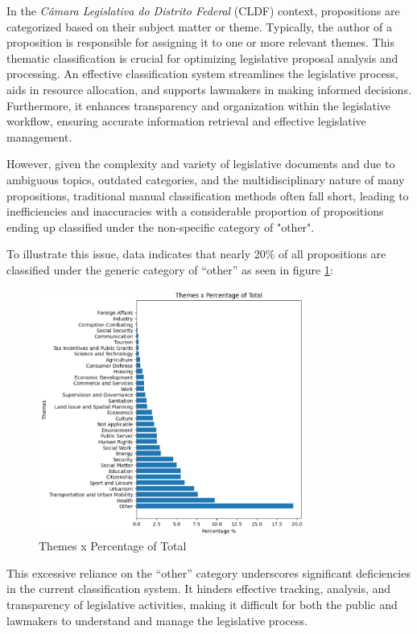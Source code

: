 \documentclass[12pt]{article}
\begin{document}
In the \emph{Câmara Legislativa do Distrito Federal} (CLDF) context, propositions are categorized based on their subject matter or theme. Typically, the author of a proposition is responsible for assigning it to one or more relevant themes. This thematic classification is crucial for optimizing legislative proposal analysis and processing. An effective classification system streamlines the legislative process, aids in resource allocation, and supports lawmakers in making informed decisions. Furthermore, it enhances transparency and organization within the legislative workflow, ensuring accurate information retrieval and effective legislative management.

However, given the complexity and variety of legislative documents and due to ambiguous topics, outdated categories, and the multidisciplinary nature of many propositions, traditional manual classification methods often fall short, leading to inefficiencies and inaccuracies with a considerable proportion of propositions ending up classified under the non-specific category of "other". 


To illustrate this issue, data indicates that nearly 20\% of all propositions are classified under the generic category of ``other'' as seen in figure \ref{fig:themes}: 


\begin{figure}[ht]
	\centering
	\includegraphics[width=0.8\textwidth]{fig/graphThemesPercentage.png}
	\caption{Themes x Percentage of Total}
	\label{fig:themes}
\end{figure}

This excessive reliance on the ``other'' category underscores significant deficiencies in the current classification system. It hinders effective tracking, analysis, and transparency of legislative activities, making it difficult for both the public and lawmakers to understand and manage the legislative process.
\end{document}
